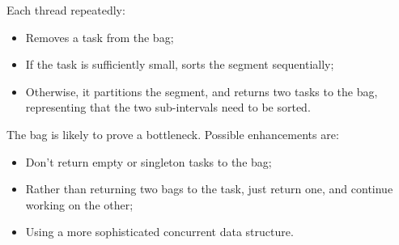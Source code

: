 \begin{slide}


Each thread repeatedly:
%
\begin{itemize}
\item Removes a task from the bag;

\item If the task is sufficiently small, sorts the segment sequentially;

\item Otherwise, it partitions the segment, and returns two tasks to the bag,
  representing that the two sub-intervals need to be sorted.
\end{itemize}

The bag is likely to prove a bottleneck.  Possible enhancements are:
%
\begin{itemize}
\item Don't return empty or singleton tasks to the bag;

\item Rather than returning two bags to the task, just return one, and
  continue working on the other;

\item Using a more sophisticated concurrent data structure.
\end{itemize}
\end{slide}







